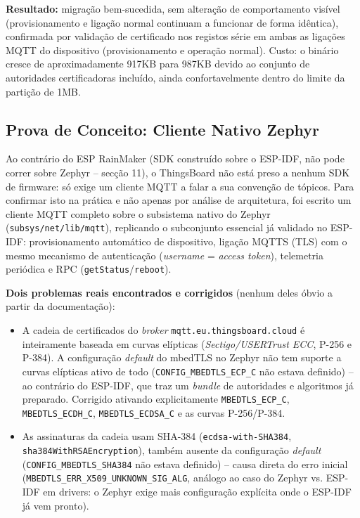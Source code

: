 \documentclass[a4paper,12pt]{article}
\begin{document}
\textbf{Resultado:} migração bem-sucedida, sem alteração de comportamento visível (provisionamento e ligação normal continuam a funcionar de forma idêntica), confirmada por validação de certificado nos registos série em ambas as ligações MQTT do dispositivo (provisionamento e operação normal). Custo: o binário cresce de aproximadamente 917KB para 987KB devido ao conjunto de autoridades certificadoras incluído, ainda confortavelmente dentro do limite da partição de 1MB.

\subsection{Prova de Conceito: Cliente Nativo Zephyr}
Ao contrário do ESP RainMaker (SDK construído sobre o ESP-IDF, não pode correr sobre Zephyr -- secção 11), o ThingsBoard não está preso a nenhum SDK de firmware: só exige um cliente MQTT a falar a sua convenção de tópicos. Para confirmar isto na prática e não apenas por análise de arquitetura, foi escrito um cliente MQTT completo sobre o subsistema nativo do Zephyr (\texttt{subsys/net/lib/mqtt}), replicando o subconjunto essencial já validado no ESP-IDF: provisionamento automático de dispositivo, ligação MQTTS (TLS) com o mesmo mecanismo de autenticação (\textit{username} = \textit{access token}), telemetria periódica e RPC (\texttt{getStatus}/\texttt{reboot}).

\textbf{Dois problemas reais encontrados e corrigidos} (nenhum deles óbvio a partir da documentação):
\begin{itemize}
    \item A cadeia de certificados do \textit{broker} \texttt{mqtt.eu.thingsboard.cloud} é inteiramente baseada em curvas elípticas (\textit{Sectigo/USERTrust ECC}, P-256 e P-384). A configuração \textit{default} do mbedTLS no Zephyr não tem suporte a curvas elípticas ativo de todo (\texttt{CONFIG\_MBEDTLS\_ECP\_C} não estava definido) -- ao contrário do ESP-IDF, que traz um \textit{bundle} de autoridades e algoritmos já preparado. Corrigido ativando explicitamente \texttt{MBEDTLS\_ECP\_C}, \texttt{MBEDTLS\_ECDH\_C}, \texttt{MBEDTLS\_ECDSA\_C} e as curvas P-256/P-384.
    \item As assinaturas da cadeia usam SHA-384 (\texttt{ecdsa-with-SHA384}, \texttt{sha384WithRSAEncryption}), também ausente da configuração \textit{default} (\texttt{CONFIG\_MBEDTLS\_SHA384} não estava definido) -- causa direta do erro inicial (\texttt{MBEDTLS\_ERR\_X509\_UNKNOWN\_SIG\_ALG}, análogo ao caso do Zephyr vs. ESP-IDF em drivers: o Zephyr exige mais configuração explícita onde o ESP-IDF já vem pronto).
\end{itemize}
\end{document}
